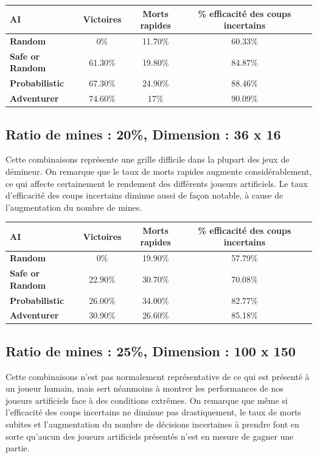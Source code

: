 \documentclass{article}
\begin{document}
\begin{tabular}{| l | c | c | c | c | }
        \hline
	\textbf{AI} & \textbf{Victoires} & \textbf{Morts rapides} & \textbf{\% efficacité des coups incertains} \\
        \hline
	\textbf{Random} & 0\% & 11.70\% & 60.33\% \\
        \hline
	\textbf{Safe or Random} & 61.30\% & 19.80\% & 84.87\% \\
        \hline
	\textbf{Probabilistic} & 67.30\% & 24.90\% & 88.46\% \\
        \hline
	\textbf{Adventurer} & 74.60\% & 17\% & 90.09\% \\
        \hline
\end{tabular}

\subsection{Ratio de mines : 20\%, Dimension : 36 x 16}

Cette combinaisons représente une grille difficile dans la plupart des jeux de démineur. On remarque que le taux de morts rapides augmente
considérablement, ce qui affecte certainement le rendement des différents joueurs artificiels. Le taux d'efficacité des coups incertains diminue 
aussi de façon notable, à cause de l'augmentation du nombre de mines.

\begin{tabular}{| l | c | c | c | c | }
        \hline
	\textbf{AI} & \textbf{Victoires} & \textbf{Morts rapides} & \textbf{\% efficacité des coups incertains} \\
        \hline
	\textbf{Random} & 0\% & 19.90\% & 57.79\% \\
        \hline
	\textbf{Safe or Random} & 22.90\% & 30.70\% & 70.08\% \\
        \hline
	\textbf{Probabilistic} & 26.00\% & 34.00\% & 82.77\% \\
        \hline
	\textbf{Adventurer} & 30.90\% & 26.60\% & 85.18\% \\
        \hline
\end{tabular}

\subsection{Ratio de mines : 25\%, Dimension : 100 x 150}

Cette combinaisons n'est pas normalement représentative de ce qui est présenté à un joueur humain, mais sert néanmoins à montrer
les performances de nos joueurs artificiels face à des conditions extrêmes. On remarque que même si l'efficacité des coups
incertains ne diminue pas drastiquement, le taux de morts subites et l'augmentation du nombre de décisions incertaines à prendre
font en sorte qu'aucun des joueurs artificiels présentés n'est en mesure de gagner une partie.
\end{document}
